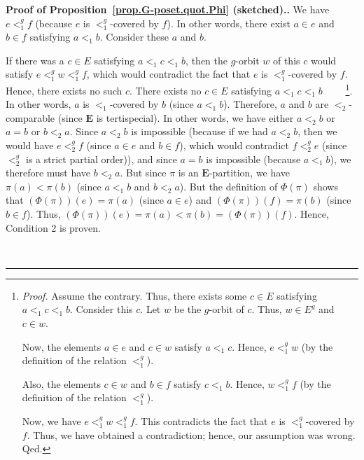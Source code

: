 \documentclass[numbers=enddot,12pt,final,onecolumn,notitlepage,abstracton]{scrartcl}
\theoremstyle{definition}
\newenvironment{proof}[1][Proof]{\noindent\textbf{#1.} }{\ \rule{0.5em}{0.5em}}
\newenvironment{verlong}{}{}
\newenvironment{vershort}{}{}
\newcommand{\EE}{{\mathbf{E}}}
\begin{document}
\begin{proof}[Proof of Proposition~\ref{prop.G-poset.quot.Phi} (sketched).]
We have $e<_{1}^{g}f$ (because $e$ is $<_{1}^{g}$-covered by $f$). In other
words, there exist $a\in e$ and $b\in f$ satisfying $a<_{1}b$. Consider these
$a$ and $b$.

\begin{vershort}
If there was a $c \in E$ satisfying $a <_1 c <_1 b$, then
the $g$-orbit $w$ of this $c$ would satisfy
$e <_1^g w <_1^g f$, which would contradict the fact that $e$ is
$<_1^g$-covered by $f$. Hence, there exists no such $c$.
\end{vershort}
\begin{verlong}
There exists no $c \in E$ satisfying $a <_1 c <_1 b$
\ \ \ \ \footnote{\textit{Proof.} Assume the contrary. Thus,
there exists some $c \in E$ satisfying $a <_1 c <_1 b$. Consider
this $c$. Let $w$ be the $g$-orbit of $c$. Thus, $w \in E^g$
and $c \in w$.
\par
Now, the elements $a \in e$ and $c \in w$ satisfy
$a <_1 c$. Hence, $e <_1^g w$ (by the definition of the
relation $<_1^g$).
\par
Also, the elements $c \in w$ and $b \in f$ satisfy
$c <_1 b$. Hence, $w <_1^g f$ (by the definition of the
relation $<_1^g$).
\par
Now, we have $e <_1^g w <_1^g f$. This contradicts the
fact that $e$ is $<_1^g$-covered by $f$. Thus, we have
obtained a contradiction; hence, our assumption was wrong.
Qed.}.
\end{verlong}
In other words, $a$ is $<_{1}$-covered by $b$ (since $a<_{1}b$). Therefore,
$a$ and $b$ are $<_{2}$-comparable (since $\EE$ is tertispecial). In
other words, we have either $a<_{2}b$ or $a=b$ or $b<_{2}a$. Since $a<_{2}b$
is impossible (because if we had $a<_{2}b$, then we would have $e<_{2}^{g}f$
(since $a\in e$ and $b\in f$), which would contradict $f<_{2}^{g}e$ (since
$<_{2}^{g}$ is a strict partial order)), and since $a=b$ is
impossible (because $a<_{1}b$), we therefore must have $b<_{2}a$. But since
$\pi$ is an $\EE$-partition, we have $\pi\left(  a\right)  <\pi\left(
b\right)  $ (since $a<_{1}b$ and $b<_{2}a$). But the definition of
$\Phi\left(  \pi\right)  $ shows that $\left(  \Phi\left(  \pi\right)
\right)  \left(  e\right)  =\pi\left(  a\right)  $ (since $a\in e$) and
$\left(  \Phi\left(  \pi\right)  \right)  \left(  f\right)  =\pi\left(
b\right)  $ (since $b\in f$). Thus, $\left(  \Phi\left(  \pi\right)  \right)
\left(  e\right)  =\pi\left(  a\right)  <\pi\left(  b\right)  =\left(
\Phi\left(  \pi\right)  \right)  \left(  f\right)  $. Hence, Condition 2 is proven.


\end{proof}
\end{document}
